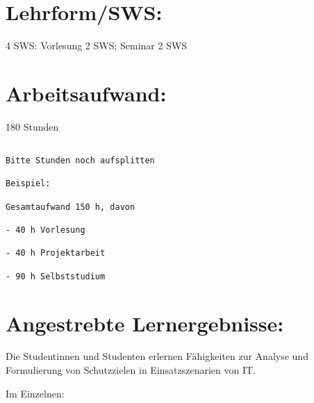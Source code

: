 \section*{Lehrform/SWS:}\label{lehrformsws-25}

4 SWS: Vorlesung 2 SWS; Seminar 2 SWS

\section*{Arbeitsaufwand:}\label{arbeitsaufwand-25}

180 Stunden

\begin{verbatim}

Bitte Stunden noch aufsplitten

Beispiel:

Gesamtaufwand 150 h, davon 

- 40 h Vorlesung 

- 40 h Projektarbeit  

- 90 h Selbststudium 
\end{verbatim}

\section*{Angestrebte
Lernergebnisse:}\label{angestrebte-lernergebnisse-25}

Die Studentinnen und Studenten erlernen Fähigkeiten zur Analyse und
Formulierung von Schutzzielen in Einsatzszenarien von IT.

Im Einzelnen:

